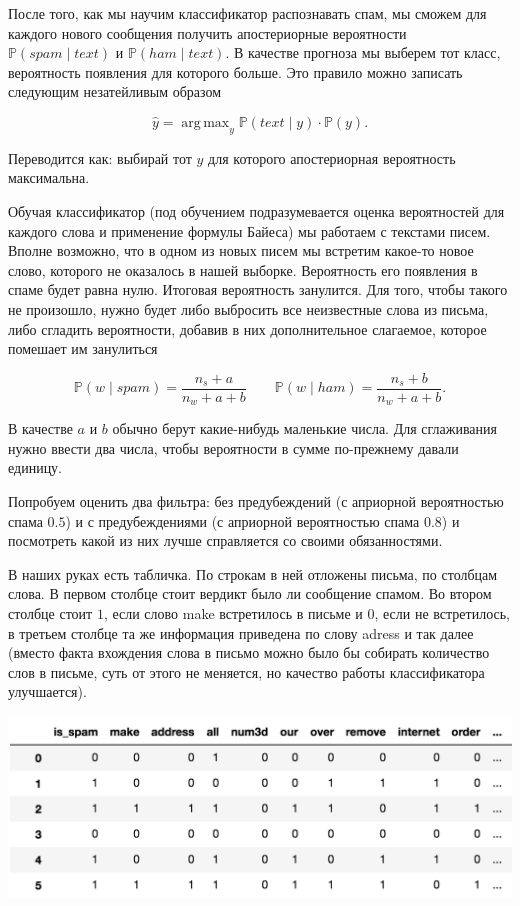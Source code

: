 \documentclass[12pt, a4paper, oneside]{extreport}
\DeclareMathOperator*{\argmax}{arg\,max}
\def \mbb{\mathbb}
\def \PP{\mbb{P}}
\theoremstyle{plain}              %
\theoremstyle{definition}         %
\begin{document}
После того, как мы научим классификатор распознавать спам, мы сможем для каждого нового сообщения получить апостериорные вероятности $\PP(spam \mid text)$  и $\PP(ham \mid text)$. В качестве прогноза мы выберем тот класс, вероятность появления для которого больше. Это правило можно записать следующим незатейливым образом

\[ \hat y = \argmax_{y} \PP(text \mid y) \cdot \PP(y). \] 

Переводится как: выбирай тот $y$ для которого апостериорная вероятность максимальна. 

Обучая классификатор (под обучением подразумевается оценка вероятностей для каждого слова и применение формулы Байеса) мы работаем с текстами писем. Вполне возможно, что в одном из новых писем мы встретим какое-то новое слово, которого не оказалось в нашей выборке. Вероятность его появления в спаме будет равна нулю. Итоговая вероятность занулится. Для того, чтобы такого не произошло, нужно будет либо выбросить все неизвестные слова из письма, либо сгладить вероятности, добавив в них дополнительное слагаемое, которое помешает им занулиться
	
	\[ \PP(w \mid spam) = \frac{n_s + a}{n_w + a + b} \qquad \PP(w \mid ham) = \frac{n_s + b}{n_w + a + b}.\]
	
В качестве $a$ и $b$ обычно берут какие-нибудь маленькие числа.  Для сглаживания нужно ввести два числа, чтобы вероятности в сумме по-прежнему давали единицу.  

Попробуем оценить два фильтра: без предубеждений (с априорной вероятностью спама $0.5$) и с предубеждениями (с априорной вероятностью спама $0.8$) и посмотреть какой из них лучше справляется со своими обязанностями.  

В наших руках есть табличка. По строкам в ней отложены письма, по столбцам слова.  В первом столбце стоит вердикт было ли сообщение спамом. Во втором столбце стоит $1$, если слово make встретилось в письме и $0$, если не встретилось, в третьем столбце та же информация приведена по слову adress и так далее (вместо факта вхождения слова в письмо можно было бы собирать количество слов в письме, суть от этого не меняется, но качество работы классификатора улучшается).

\begin{center}
\includegraphics[scale=0.27]{spam_table.png}
\end{center}
\end{document}
